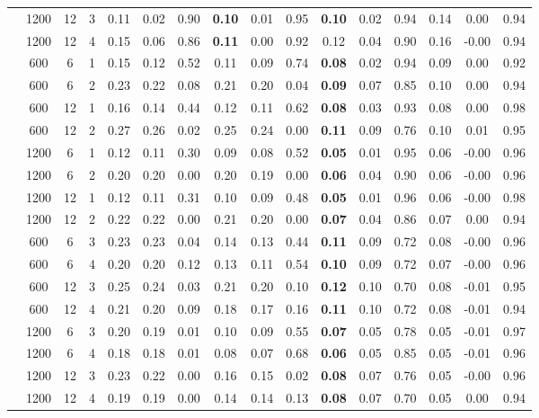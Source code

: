 \begin{table}[ht]
\begin{tabular}{||c|ccc||ccc|ccc|ccc|ccc}
   & 1200 & 12 & 3 & 0.11 & 0.02 & 0.90 & \bf 0.10 & 0.01 & 0.95 & \bf 0.10 & 0.02 & 0.94 & 0.14 & 0.00 & 0.94 \\ 
   & 1200 & 12 & 4 & 0.15 & 0.06 & 0.86 & \bf 0.11 & 0.00 & 0.92 & 0.12 & 0.04 & 0.90 & 0.16 & -0.00 & 0.94 \\ 
   \hline
 & 600 & 6 & 1 & 0.15 & 0.12 & 0.52 & 0.11 & 0.09 & 0.74 & \bf 0.08 & 0.02 & 0.94 & 0.09 & 0.00 & 0.92 \\ 
   & 600 & 6 & 2 & 0.23 & 0.22 & 0.08 & 0.21 & 0.20 & 0.04 & \bf 0.09 & 0.07 & 0.85 & 0.10 & 0.00 & 0.94 \\ 
   & 600 & 12 & 1 & 0.16 & 0.14 & 0.44 & 0.12 & 0.11 & 0.62 & \bf 0.08 & 0.03 & 0.93 & 0.08 & 0.00 & 0.98 \\ 
   & 600 & 12 & 2 & 0.27 & 0.26 & 0.02 & 0.25 & 0.24 & 0.00 & \bf 0.11 & 0.09 & 0.76 & 0.10 & 0.01 & 0.95 \\ 
   & 1200 & 6 & 1 & 0.12 & 0.11 & 0.30 & 0.09 & 0.08 & 0.52 & \bf 0.05 & 0.01 & 0.95 & 0.06 & -0.00 & 0.96 \\ 
   & 1200 & 6 & 2 & 0.20 & 0.20 & 0.00 & 0.20 & 0.19 & 0.00 & \bf 0.06 & 0.04 & 0.90 & 0.06 & -0.00 & 0.96 \\ 
   & 1200 & 12 & 1 & 0.12 & 0.11 & 0.31 & 0.10 & 0.09 & 0.48 & \bf 0.05 & 0.01 & 0.96 & 0.06 & -0.00 & 0.98 \\ 
   & 1200 & 12 & 2 & 0.22 & 0.22 & 0.00 & 0.21 & 0.20 & 0.00 & \bf 0.07 & 0.04 & 0.86 & 0.07 & 0.00 & 0.94 \\ 
   \hline
 & 600 & 6 & 3 & 0.23 & 0.23 & 0.04 & 0.14 & 0.13 & 0.44 & \bf 0.11 & 0.09 & 0.72 & 0.08 & -0.00 & 0.96 \\ 
   & 600 & 6 & 4 & 0.20 & 0.20 & 0.12 & 0.13 & 0.11 & 0.54 & \bf 0.10 & 0.09 & 0.72 & 0.07 & -0.00 & 0.96 \\ 
   & 600 & 12 & 3 & 0.25 & 0.24 & 0.03 & 0.21 & 0.20 & 0.10 & \bf 0.12 & 0.10 & 0.70 & 0.08 & -0.01 & 0.95 \\ 
   & 600 & 12 & 4 & 0.21 & 0.20 & 0.09 & 0.18 & 0.17 & 0.16 & \bf 0.11 & 0.10 & 0.72 & 0.08 & -0.01 & 0.94 \\ 
   & 1200 & 6 & 3 & 0.20 & 0.19 & 0.01 & 0.10 & 0.09 & 0.55 & \bf 0.07 & 0.05 & 0.78 & 0.05 & -0.01 & 0.97 \\ 
   & 1200 & 6 & 4 & 0.18 & 0.18 & 0.01 & 0.08 & 0.07 & 0.68 & \bf 0.06 & 0.05 & 0.85 & 0.05 & -0.01 & 0.96 \\ 
   & 1200 & 12 & 3 & 0.23 & 0.22 & 0.00 & 0.16 & 0.15 & 0.02 & \bf 0.08 & 0.07 & 0.76 & 0.05 & -0.00 & 0.96 \\ 
   & 1200 & 12 & 4 & 0.19 & 0.19 & 0.00 & 0.14 & 0.14 & 0.13 & \bf 0.08 & 0.07 & 0.70 & 0.05 & 0.00 & 0.94 \\ 
   \hline
\hline
\end{tabular}
\end{table}
